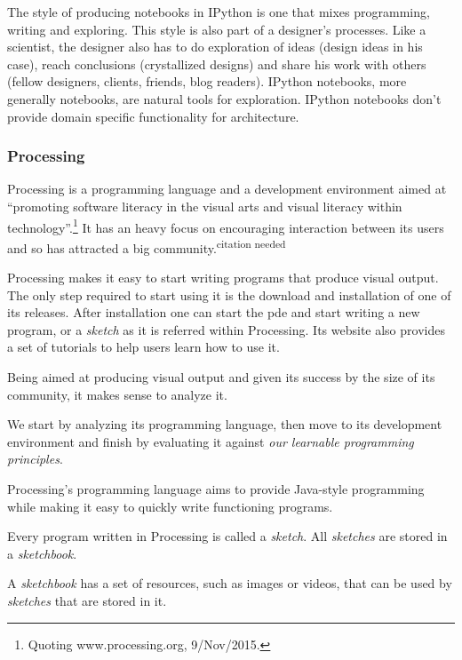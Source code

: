 \documentclass{./llncs2e/llncs}
\begin{document}
	The style of producing notebooks in IPython is one that mixes programming, writing and exploring. 
	This style is also part of a designer's processes. 
	Like a scientist, the designer also has to do exploration of ideas (design ideas in his case), reach conclusions (crystallized designs) and share his work with others (fellow designers, clients, friends, blog readers). 
	IPython notebooks, more generally notebooks, are natural tools for exploration.
	IPython notebooks don't provide domain specific functionality for architecture.
	
\subsubsection{Processing\cite{reas2007processing}}
	Processing is a programming language and a development environment aimed at ``promoting software literacy in the visual arts and visual literacy within technology''.\footnote{Quoting www.processing.org, 9/Nov/2015.}
	It has an heavy focus on encouraging interaction between its users and so has attracted a big community.\textsuperscript{citation needed}
	
	Processing makes it easy to start writing programs that produce visual output. 
	The only step required to start using it is the download and installation of one of its releases. 
	After installation one can start the \ac{pde} and start writing a new program, or a \emph{sketch} as it is referred within Processing. 
	Its website also provides a set of tutorials to help users learn how to use it.
	
	Being aimed at producing visual output and given its success by the size of its community, it makes sense to analyze it.
	
	We start by analyzing its programming language, then move to its development environment and finish by evaluating it against \emph{our learnable programming principles}.
	
	Processing's programming language aims to provide Java-style programming while making it easy to quickly write functioning programs. 
	
	Every program written in Processing is called a \emph{sketch}. 
	All \emph{sketches} are stored in a \emph{sketchbook}.
	
	A \emph{sketchbook} has a set of resources, such as images or videos, that can be used by \emph{sketches} that are stored in it.
	
\end{document}
